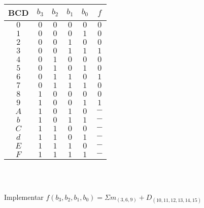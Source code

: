 \begin{frame}{\insertsection}
    \begin{columns}
        \begin{column}{0.40\textwidth}
        \scriptsize
        \begin{tabular}{c||c|c|c|c||c} %
            \hline
            BCD & $b_3$ & $b_2$ & $b_1$ & $b_0$ & $f$ \\
            \hline
            \hline
            $0$ & $0$ & $0$ & $0$ & $0$ & $0$ \\
            $1$ & $0$ & $0$ & $0$ & $1$ & $0$ \\
            $2$ & $0$ & $0$ & $1$ & $0$ & $0$ \\
            $3$ & $0$ & $0$ & $1$ & $1$ & $1$ \\
            $4$ & $0$ & $1$ & $0$ & $0$ & $0$ \\
            $5$ & $0$ & $1$ & $0$ & $1$ & $0$ \\
            $6$ & $0$ & $1$ & $1$ & $0$ & $1$ \\
            $7$ & $0$ & $1$ & $1$ & $1$ & $0$ \\
            $8$ & $1$ & $0$ & $0$ & $0$ & $0$ \\
            $9$ & $1$ & $0$ & $0$ & $1$ & $1$ \\
            $A$ & $1$ & $0$ & $1$ & $0$ & $-$ \\
            $b$ & $1$ & $0$ & $1$ & $1$ & $-$ \\
            $C$ & $1$ & $1$ & $0$ & $0$ & $-$ \\
            $d$ & $1$ & $1$ & $0$ & $1$ & $-$ \\
            $E$ & $1$ & $1$ & $1$ & $0$ & $-$ \\
            $F$ & $1$ & $1$ & $1$ & $1$ & $-$ \\
            \hline
        \end{tabular} \\
        \end{column}
        \begin{column}{0.60\textwidth}
    \begin{karnaugh-map}[4][4][1][$x_1x_0$][$x_3x_2$]
      \autoterms[0]
    \end{karnaugh-map} \\
    \end{column}        
    \end{columns}
    \centering
        Implementar $f(b_3,b_2,b_1,b_0)=\Sigma m_{(3,6,9)} + D_{(10,11,12,13,14,15)}$
\end{frame}

